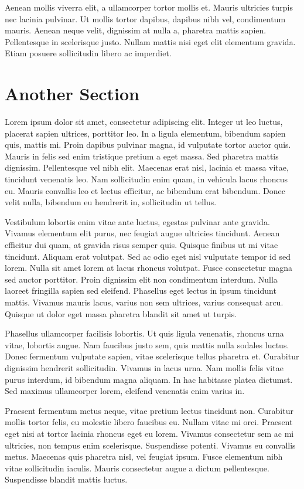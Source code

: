 Aenean mollis viverra elit, a ullamcorper tortor mollis et. Mauris ultricies turpis nec lacinia pulvinar. Ut mollis tortor dapibus, dapibus nibh vel, condimentum mauris. Aenean neque velit, dignissim at nulla a, pharetra mattis sapien. Pellentesque in scelerisque justo. Nullam mattis nisi eget elit elementum gravida. Etiam posuere sollicitudin libero ac imperdiet.

\section{Another Section}
Lorem ipsum dolor sit amet, consectetur adipiscing elit. Integer ut leo luctus, placerat sapien ultrices, porttitor leo. In a ligula elementum, bibendum sapien quis, mattis mi. Proin dapibus pulvinar magna, id vulputate tortor auctor quis. Mauris in felis sed enim tristique pretium a eget massa. Sed pharetra mattis dignissim. Pellentesque vel nibh elit. Maecenas erat nisl, lacinia et massa vitae, tincidunt venenatis leo. Nam sollicitudin enim quam, in vehicula lacus rhoncus eu. Mauris convallis leo et lectus efficitur, ac bibendum erat bibendum. Donec velit nulla, bibendum eu hendrerit in, sollicitudin ut tellus.

Vestibulum lobortis enim vitae ante luctus, egestas pulvinar ante gravida. Vivamus elementum elit purus, nec feugiat augue ultricies tincidunt. Aenean efficitur dui quam, at gravida risus semper quis. Quisque finibus ut mi vitae tincidunt. Aliquam erat volutpat. Sed ac odio eget nisl vulputate tempor id sed lorem. Nulla sit amet lorem at lacus rhoncus volutpat. Fusce consectetur magna sed auctor porttitor. Proin dignissim elit non condimentum interdum. Nulla laoreet fringilla sapien sed eleifend. Phasellus eget lectus in ipsum tincidunt mattis. Vivamus mauris lacus, varius non sem ultrices, varius consequat arcu. Quisque ut dolor eget massa pharetra blandit sit amet ut turpis.

Phasellus ullamcorper facilisis lobortis. Ut quis ligula venenatis, rhoncus urna vitae, lobortis augue. Nam faucibus justo sem, quis mattis nulla sodales luctus. Donec fermentum vulputate sapien, vitae scelerisque tellus pharetra et. Curabitur dignissim hendrerit sollicitudin. Vivamus in lacus urna. Nam mollis felis vitae purus interdum, id bibendum magna aliquam. In hac habitasse platea dictumst. Sed maximus ullamcorper lorem, eleifend venenatis enim varius in.

Praesent fermentum metus neque, vitae pretium lectus tincidunt non. Curabitur mollis tortor felis, eu molestie libero faucibus eu. Nullam vitae mi orci. Praesent eget nisi at tortor lacinia rhoncus eget eu lorem. Vivamus consectetur sem ac mi ultricies, non tempus enim scelerisque. Suspendisse potenti. Vivamus eu convallis metus. Maecenas quis pharetra nisl, vel feugiat ipsum. Fusce elementum nibh vitae sollicitudin iaculis. Mauris consectetur augue a dictum pellentesque. Suspendisse blandit mattis luctus.

